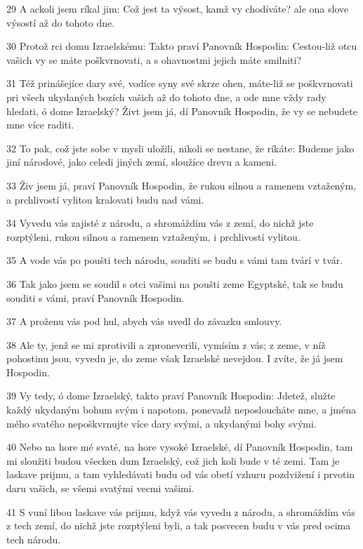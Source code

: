 \par 29 A ackoli jsem ríkal jim: Což jest ta výsost, kamž vy chodíváte? ale ona slove výsostí až do tohoto dne.
\par 30 Protož rci domu Izraelskému: Takto praví Panovník Hospodin: Cestou-liž otcu vašich vy se máte poškvrnovati, a s ohavnostmi jejich máte smilniti?
\par 31 Též prinášejíce dary své, vodíce syny své skrze ohen, máte-liž se poškvrnovati pri všech ukydaných bozích vašich až do tohoto dne, a ode mne vždy rady hledati, ó dome Izraelský? Živt jsem já, dí Panovník Hospodin, že vy se nebudete mne více raditi.
\par 32 To pak, což jste sobe v mysli uložili, nikoli se nestane, že ríkáte: Budeme jako jiní národové, jako celedi jiných zemí, sloužíce drevu a kameni.
\par 33 Živ jsem já, praví Panovník Hospodin, že rukou silnou a ramenem vztaženým, a prchlivostí vylitou kralovati budu nad vámi.
\par 34 Vyvedu vás zajisté z národu, a shromáždím vás z zemí, do nichž jste rozptýleni, rukou silnou a ramenem vztaženým, i prchlivostí vylitou.
\par 35 A vode vás po poušti tech národu, souditi se budu s vámi tam tvárí v tvár.
\par 36 Tak jako jsem se soudil s otci vašimi na poušti zeme Egyptské, tak se budu souditi s vámi, praví Panovník Hospodin.
\par 37 A proženu vás pod hul, abych vás uvedl do závazku smlouvy.
\par 38 Ale ty, jenž se mi zprotivili a zproneverili, vymísím z vás; z zeme, v níž pohostinu jsou, vyvedu je, do zeme však Izraelské nevejdou. I zvíte, že já jsem Hospodin.
\par 39 Vy tedy, ó dome Izraelský, takto praví Panovník Hospodin: Jdetež, služte každý ukydaným bohum svým i napotom, ponevadž neposloucháte mne, a jména mého svatého nepoškvrnujte více dary svými, a ukydanými bohy svými.
\par 40 Nebo na hore mé svaté, na hore vysoké Izraelské, dí Panovník Hospodin, tam mi sloužiti budou všecken dum Izraelský, což jich koli bude v té zemi. Tam je laskave prijmu, a tam vyhledávati budu od vás obetí vzhuru pozdvižení i prvotin daru vašich, se všemi svatými vecmi vašimi.
\par 41 S vuní libou laskave vás prijmu, když vás vyvedu z národu, a shromáždím vás z tech zemí, do nichž jste rozptýleni byli, a tak posvecen budu v vás pred ocima tech národu.
